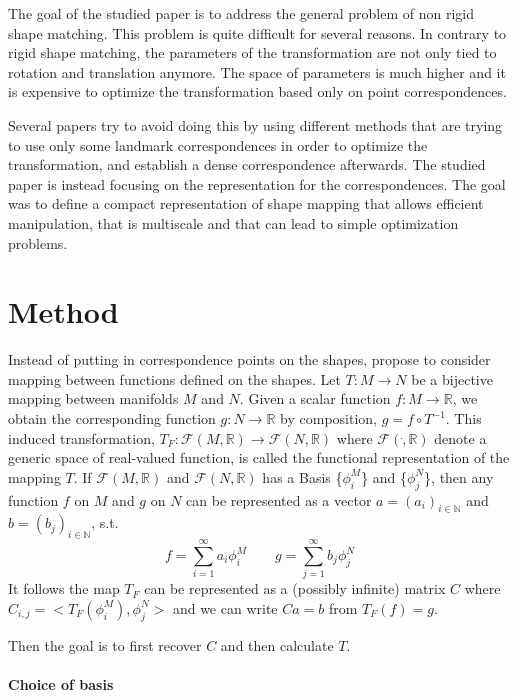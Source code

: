 \documentclass[10pt,twocolumn,letterpaper]{article}
\begin{document}
The goal of the studied paper is to address the general problem of non rigid shape matching. This problem is quite difficult for several reasons. In contrary to rigid shape matching, the parameters of the transformation are not only tied to rotation and translation anymore. The space of parameters is much higher and it is expensive to optimize the transformation based only on point correspondences. 

Several papers try to avoid doing this by using different methods that are trying to use only some landmark correspondences in order to optimize the transformation, and establish a dense correspondence afterwards. The studied paper is instead focusing on the representation for the correspondences. The goal was to define a compact representation of shape mapping that allows efficient manipulation, that is multiscale and that can lead to simple optimization problems.


\section{Method} %
Instead of putting in correspondence points on the shapes, \cite{ovs} propose to consider mapping between functions defined on the shapes. 
Let $T : M \rightarrow N$ be a bijective mapping between manifolds $M$ and $N$. Given a scalar function $f: M \rightarrow \mathbb{R}$, we obtain the corresponding function $g : N \rightarrow \mathbb{R}$ by composition, $g=f \circ T^{-1}$. This induced transformation, $T_F : \mathcal{F}(M,\mathbb{R})\rightarrow \mathcal{F}(N,\mathbb{R})$ where $\mathcal{F}(\dot,\mathbb{R})$ denote a generic space of real-valued function, is called the functional representation of the mapping $T$. 
If $\mathcal{F}(M,\mathbb{R})$ and $\mathcal{F}(N,\mathbb{R})$ has a Basis \{$\phi_i^M$\} and \{$\phi_j^N$\}, then any function $f$ on $M$ and $g$ on $N$ can be represented as a vector $a=(a_i)_{i \in \mathbb{N}}$ and $b=(b_j)_{i \in \mathbb{N}}$, s.t.
\begin{equation}
	f = \sum_{i=1}^{\infty}a_i \phi_i^M  \quad \quad g = \sum_{j=1}^{\infty}b_j \phi_j^N
\end{equation}
It follows the map $T_F$ can be represented as a (possibly infinite) matrix $C$ where $C_{i,j}=<T_F(\phi_i^M),\phi_j^N>$ and we can write $Ca=b$ from $T_F(f) = g$.

Then the goal is to first recover $C$ and then calculate $T$.

\paragraph{Choice of basis}
\end{document}
